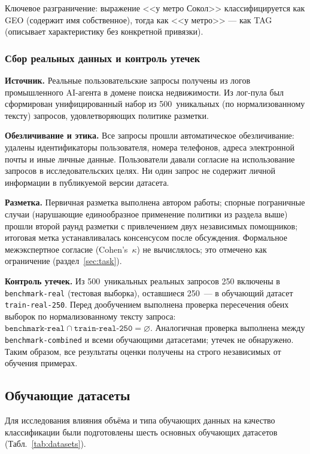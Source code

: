 \noindent Ключевое разграничение: выражение <<у метро Сокол>> классифицируется как GEO (содержит имя собственное), тогда как <<у метро>> --- как TAG (описывает характеристику без конкретной привязки).

\subsubsection{Сбор реальных данных и контроль утечек} \label{subsubsec:data_collection}

\textbf{Источник.} Реальные пользовательские запросы получены из логов промышленного AI-агента в домене поиска недвижимости. Из лог-пула был сформирован унифицированный набор из 500~уникальных (по нормализованному тексту) запросов, удовлетворяющих политике разметки.

\textbf{Обезличивание и этика.} Все запросы прошли автоматическое обезличивание: удалены идентификаторы пользователя, номера телефонов, адреса электронной почты и иные личные данные. Пользователи давали согласие на использование запросов в исследовательских целях. Ни один запрос не содержит личной информации в публикуемой версии датасета.

\textbf{Разметка.} Первичная разметка выполнена автором работы; спорные пограничные случаи (нарушающие единообразное применение политики из раздела выше) прошли второй раунд разметки с привлечением двух независимых помощников; итоговая метка устанавливалась консенсусом после обсуждения. Формальное межэкспертное согласие (Cohen's~$\kappa$) не вычислялось; это отмечено как ограничение (раздел~\ref{sec:task}).

\textbf{Контроль утечек.} Из 500~уникальных реальных запросов 250 включены в \texttt{benchmark-real} (тестовая выборка), оставшиеся 250~--- в обучающий датасет \texttt{train-real-250}. Перед дообучением выполнена проверка пересечения обеих выборок по нормализованному тексту запроса: $\texttt{benchmark-real} \cap \texttt{train-real-250} = \varnothing$. Аналогичная проверка выполнена между \texttt{benchmark-combined} и всеми обучающими датасетами; утечек не обнаружено. Таким образом, все результаты оценки получены на строго независимых от обучения примерах.

\subsection{Обучающие датасеты} \label{subsec:datasets}

Для исследования влияния объёма и типа обучающих данных на качество классификации были подготовлены шесть основных обучающих датасетов (Табл.~\ref{tab:datasets}).

